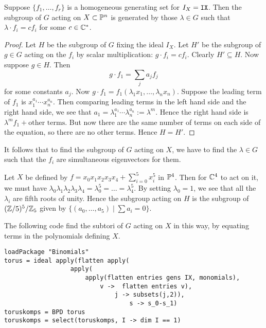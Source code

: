 \begin{lemma}
Suppose $\{ f_1,\ldots, f_r \}$ is a homogeneous generating set for $I_X=\text{\texttt{IX}}$. Then the subgroup of $G$ acting on $X \subset \P^n$ is generated by those $\lambda \in G$ such that $\lambda \cdot f_i  = c f_i$ for some $c \in \C^\ast$.
\end{lemma}
\begin{proof}
Let $H$ be the subgroup of $G$ fixing the ideal $I_X$. Let $H'$ be the subgroup of $g \in G$ acting on the $f_i$ by scalar multiplication: $g \cdot f_i =c f_i$. Clearly $H' \subseteq H$.  Now suppose $g \in H$. Then
$$
g \cdot f_1 = \sum_j a_j f_j
$$
for some constants $a_j$. Now $g \cdot f_1 = f_1(\lambda_1 x _1 ,\ldots, \lambda_n x_n)$. Suppose the leading term of $f_1$ is $x_1^{a_1}\cdots x_n^{a_n}$. Then comparing leading terms in the left hand side and the right hand side, we see that $a_1 = \lambda_1^{a_1}\cdots \lambda_n^{a_n} := \lambda^m$. Hence the right hand side is $\lambda^m f_1 + \text{other terms}$. But now there are the same number of terms on each side of the equation, so there are no other terms. Hence $H=H'$. 
\end{proof}

It follows that to find the subgroup of $G$ acting on $X$, we have to find the $\lambda \in G$ such that the $f_i$ are simultaneous eigenvectors for them.

\begin{example}
\label{example:torus}
Let  $X$ be defined by $f = x_0x_1x_2x_3x_4+\sum_{i=0}^5 x_i^5$ in $\P^4$. Then for $\C^4$ to act on it, we must have $\lambda_0\lambda_1\lambda_2\lambda_3\lambda_4=\lambda_0^5=\ldots=\lambda_4^5$. By setting $\lambda_0=1$, we see that all the $\lambda_i$ are fifth roots of unity. Hence the subgroup acting on $H$ is the subgroup of $(\Z/5)^5/\Z_5$ given by $\{ (a_0,\ldots,a_5) \mid \sum a_i = 0 \}$.
\end{example}

The following code find the subtori of $G$ acting on $X$ in this way, by equating terms in the polynomials defining $X$.

\begin{lstlisting}[language=Macaulay2]
loadPackage "Binomials"
torus = ideal apply(flatten apply(
                  apply(
                      apply(flatten entries gens IX, monomials),
                          v ->  flatten entries v), 
                              j -> subsets(j,2)),
                                  s -> s_0-s_1)
toruskomps = BPD torus
toruskomps = select(toruskomps, I -> dim I == 1)
\end{lstlisting}

